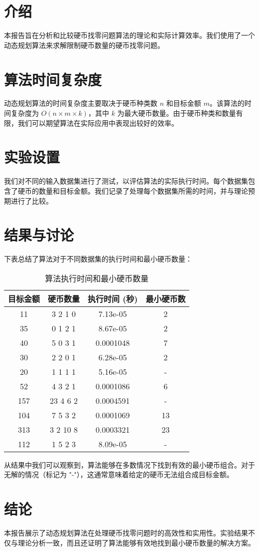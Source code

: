 \documentclass[twoside,a4paper,10pt]{article}
\begin{document}
\pagestyle{fancy}
\fancyhead{}
\rhead{\today}


\section{介绍}
本报告旨在分析和比较硬币找零问题算法的理论和实际计算效率。我们使用了一个动态规划算法来求解限制硬币数量的硬币找零问题。

\section{算法时间复杂度}
动态规划算法的时间复杂度主要取决于硬币种类数 \( n \) 和目标金额 \( m \)。该算法的时间复杂度为 \( O(n \times m \times k) \)，其中 \( k \) 为最大硬币数量。由于硬币种类和数量有限，我们可以期望算法在实际应用中表现出较好的效率。

\section{实验设置}
我们对不同的输入数据集进行了测试，以评估算法的实际执行时间。每个数据集包含了硬币的数量和目标金额。我们记录了处理每个数据集所需的时间，并与理论预期进行了比较。

\section{结果与讨论}
下表总结了算法对于不同数据集的执行时间和最小硬币数量：

\begin{table}[h]
\centering
\begin{tabular}{|c|c|c|c|}
\hline
目标金额 & 硬币数量 & 执行时间 (秒) & 最小硬币数 \\
\hline
11 & 3 2 1 0 & 7.13e-05 & 2 \\
35 & 0 1 2 1 & 8.67e-05 & 2 \\
40 & 5 0 3 1 & 0.0001048 & 7 \\
30 & 2 2 0 1 & 6.28e-05 & 2 \\
20 & 1 1 1 1 & 5.16e-05 & - \\
52 & 4 3 2 1 & 0.0001086 & 6 \\
157 & 23 4 6 2 & 0.0004591 & - \\
104 & 7 5 3 2 & 0.0001069 & 13 \\
313 & 3 2 10 8 & 0.0003321 & 23 \\
112 & 1 5 2 3 & 8.09e-05 & - \\
\hline
\end{tabular}
\caption{算法执行时间和最小硬币数量}
\end{table}

从结果中我们可以观察到，算法能够在多数情况下找到有效的最小硬币组合。对于无解的情况（标记为 "-"），这通常意味着给定的硬币无法组合成目标金额。

\section{结论}
本报告展示了动态规划算法在处理硬币找零问题时的高效性和实用性。实验结果不仅与理论分析一致，而且还证明了算法能够有效地找到最小硬币数量的解决方案。
\end{document}
